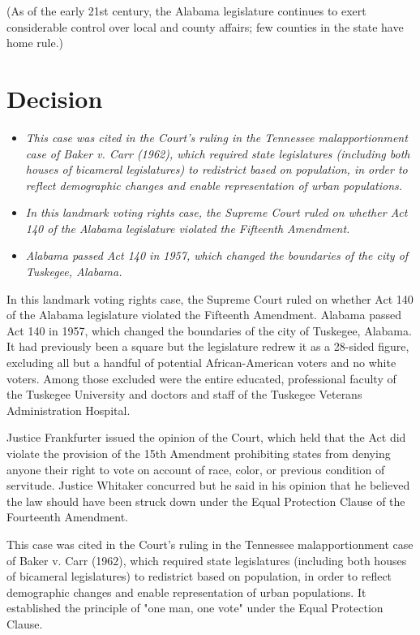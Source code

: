 (As of the early 21st century, the Alabama legislature continues to
exert considerable control over local and county affairs; few counties
in the state have home rule.)

\section{Decision}\label{decision}

\begin{itemize}
\item
  \emph{This case was cited in the Court's ruling in the Tennessee
  malapportionment case of Baker v. Carr (1962), which required state
  legislatures (including both houses of bicameral legislatures) to
  redistrict based on population, in order to reflect demographic
  changes and enable representation of urban populations.}
\item
  \emph{In this landmark voting rights case, the Supreme Court ruled on
  whether Act 140 of the Alabama legislature violated the Fifteenth
  Amendment.}
\item
  \emph{Alabama passed Act 140 in 1957, which changed the boundaries of
  the city of Tuskegee, Alabama.}
\end{itemize}

In this landmark voting rights case, the Supreme Court ruled on whether
Act 140 of the Alabama legislature violated the Fifteenth Amendment.
Alabama passed Act 140 in 1957, which changed the boundaries of the city
of Tuskegee, Alabama. It had previously been a square but the
legislature redrew it as a 28-sided figure, excluding all but a handful
of potential African-American voters and no white voters. Among those
excluded were the entire educated, professional faculty of the Tuskegee
University and doctors and staff of the Tuskegee Veterans Administration
Hospital.

Justice Frankfurter issued the opinion of the Court, which held that the
Act did violate the provision of the 15th Amendment prohibiting states
from denying anyone their right to vote on account of race, color, or
previous condition of servitude. Justice Whitaker concurred but he said
in his opinion that he believed the law should have been struck down
under the Equal Protection Clause of the Fourteenth Amendment.

This case was cited in the Court's ruling in the Tennessee
malapportionment case of Baker v. Carr (1962), which required state
legislatures (including both houses of bicameral legislatures) to
redistrict based on population, in order to reflect demographic changes
and enable representation of urban populations. It established the
principle of "one man, one vote" under the Equal Protection Clause.

